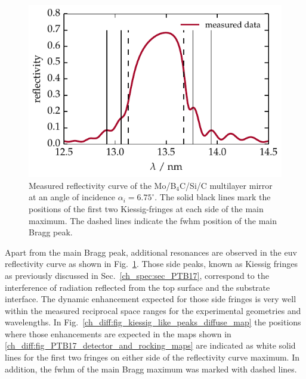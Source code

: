 \begin{figure}[htbp]
        \includegraphics{img/kiessig_like_peaks_reflectivity_curve} \caption{Measured reflectivity curve of the Mo/B$_4$C/Si/C multilayer mirror at an angle of incidence $\alpha_i = 6.75^\circ$. The solid black lines mark the positions of the first two Kiessig-fringes at each side of the main maximum. The dashed lines indicate the \gls{fwhm} position of the main Bragg peak.}
        \label{ch_diff:fig_ptb17_reflectance_AOI_675} 
\end{figure}
Apart from the main Bragg peak, additional resonances are observed in the \gls{euv} reflectivity curve as shown in Fig.~\ref{ch_diff:fig_ptb17_reflectance_AOI_675}. Those side peaks, known as Kiessig fringes \cite{kiessig_interferenz_1931} as previously discussed in Sec.~\ref{ch_spec:sec_PTB17}, correspond to the interference of radiation reflected from the top surface and the substrate interface. The dynamic enhancement expected for those side fringes is very well within the measured reciprocal space ranges for the experimental geometries and wavelengths. In Fig.~\ref{ch_diff:fig_kiessig_like_peaks_diffuse_map} the positions where those enhancements are expected in the maps shown in \ref{ch_diff:fig_PTB17_detector_and_rocking_maps} are indicated as white solid lines for the first two fringes on either side of the reflectivity curve maximum. In addition, the \gls{fwhm} of the main Bragg maximum was marked with dashed lines.

